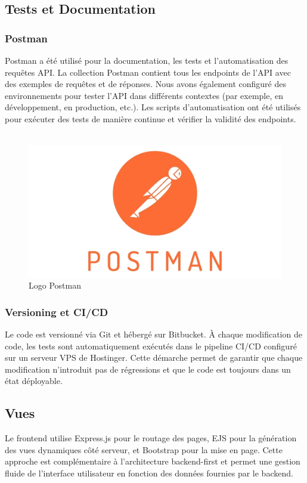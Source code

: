 \subsection*{Tests et Documentation}
\subsubsection*{Postman}
Postman a été utilisé pour la documentation, les tests et l’automatisation des requêtes API. La collection Postman contient tous les endpoints de l'API avec des exemples de requêtes et de réponses. Nous avons également configuré des environnements pour tester l’API dans différents contextes (par exemple, en développement, en production, etc.). Les scripts d’automatisation ont été utilisés pour exécuter des tests de manière continue et vérifier la validité des endpoints. \\\\

\begin{figure}[H]
\begin{center}
\includegraphics[width=15cm]{assets/presentation/postman-logo-vert-2018.jpg}
\end{center}
\caption{Logo Postman}
\end{figure}


\subsubsection*{Versioning et CI/CD}
Le code est versionné via Git et hébergé sur Bitbucket. À chaque modification de code, les tests sont automatiquement exécutés dans le pipeline CI/CD configuré sur un serveur VPS de Hostinger. Cette démarche permet de garantir que chaque modification n'introduit pas de régressions et que le code est toujours dans un état déployable.

\subsection*{Vues}
Le frontend utilise Express.js pour le routage des pages, EJS pour la génération des vues dynamiques côté serveur, et Bootstrap pour la mise en page. Cette approche est complémentaire à l'architecture backend-first et permet une gestion fluide de l'interface utilisateur en fonction des données fournies par le backend.

